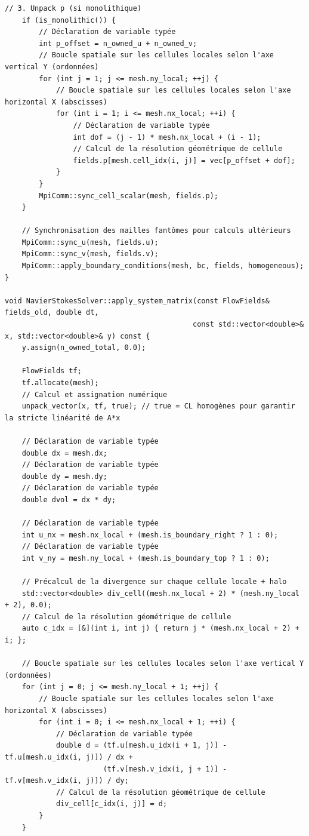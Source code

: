 \documentclass[10pt,a4paper,oneside]{book}
\begin{document}
\begin{lstlisting}[language={[11]C++}]
    // 3. Unpack p (si monolithique)
    if (is_monolithic()) {
        // Déclaration de variable typée
        int p_offset = n_owned_u + n_owned_v;
        // Boucle spatiale sur les cellules locales selon l'axe vertical Y (ordonnées)
        for (int j = 1; j <= mesh.ny_local; ++j) {
            // Boucle spatiale sur les cellules locales selon l'axe horizontal X (abscisses)
            for (int i = 1; i <= mesh.nx_local; ++i) {
                // Déclaration de variable typée
                int dof = (j - 1) * mesh.nx_local + (i - 1);
                // Calcul de la résolution géométrique de cellule
                fields.p[mesh.cell_idx(i, j)] = vec[p_offset + dof];
            }
        }
        MpiComm::sync_cell_scalar(mesh, fields.p);
    }

    // Synchronisation des mailles fantômes pour calculs ultérieurs
    MpiComm::sync_u(mesh, fields.u);
    MpiComm::sync_v(mesh, fields.v);
    MpiComm::apply_boundary_conditions(mesh, bc, fields, homogeneous);
}

void NavierStokesSolver::apply_system_matrix(const FlowFields& fields_old, double dt,
                                            const std::vector<double>& x, std::vector<double>& y) const {
    y.assign(n_owned_total, 0.0);

    FlowFields tf;
    tf.allocate(mesh);
    // Calcul et assignation numérique
    unpack_vector(x, tf, true); // true = CL homogènes pour garantir la stricte linéarité de A*x

    // Déclaration de variable typée
    double dx = mesh.dx;
    // Déclaration de variable typée
    double dy = mesh.dy;
    // Déclaration de variable typée
    double dvol = dx * dy;

    // Déclaration de variable typée
    int u_nx = mesh.nx_local + (mesh.is_boundary_right ? 1 : 0);
    // Déclaration de variable typée
    int v_ny = mesh.ny_local + (mesh.is_boundary_top ? 1 : 0);

    // Précalcul de la divergence sur chaque cellule locale + halo
    std::vector<double> div_cell((mesh.nx_local + 2) * (mesh.ny_local + 2), 0.0);
    // Calcul de la résolution géométrique de cellule
    auto c_idx = [&](int i, int j) { return j * (mesh.nx_local + 2) + i; };

    // Boucle spatiale sur les cellules locales selon l'axe vertical Y (ordonnées)
    for (int j = 0; j <= mesh.ny_local + 1; ++j) {
        // Boucle spatiale sur les cellules locales selon l'axe horizontal X (abscisses)
        for (int i = 0; i <= mesh.nx_local + 1; ++i) {
            // Déclaration de variable typée
            double d = (tf.u[mesh.u_idx(i + 1, j)] - tf.u[mesh.u_idx(i, j)]) / dx +
                       (tf.v[mesh.v_idx(i, j + 1)] - tf.v[mesh.v_idx(i, j)]) / dy;
            // Calcul de la résolution géométrique de cellule
            div_cell[c_idx(i, j)] = d;
        }
    }


\end{lstlisting}
\end{document}
